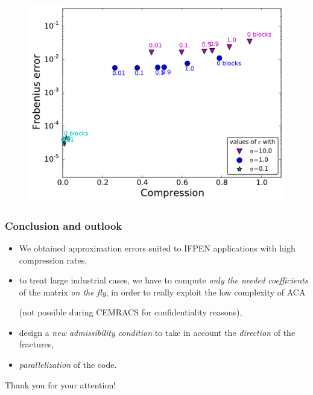 \begin{frame}
\begin{figure}
\begin{minipage}[c]{.3\linewidth}
\end{minipage}
\begin{minipage}[c]{.6\linewidth}
\includegraphics[width=\textwidth]{../images/graphe_compare_output_compression_18_08_2016matrice1363Fracs.pdf}
\end{minipage}
\end{figure}


\end{frame}



\begin{frame}
\frametitle{Conclusion and outlook}

\begin{itemize}
\item
We obtained approximation errors suited to IFPEN applications with high compression rates,
\item
to treat large industrial cases, we have to compute \emph{only the needed coefficients} of the matrix \emph{on the fly}, in order to really exploit the low complexity of ACA 

(not possible during CEMRACS for confidentiality reasons),
\item
design a \emph{new admissibility condition} to take in account the \emph{direction} of the fractures,
\item
\emph{parallelization} of the code.
\end{itemize}

\pause
\bigskip
\begin{center}
Thank you for your attention!
\end{center}

\end{frame}












